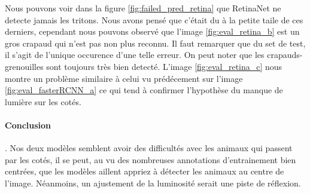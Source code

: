 Nous pouvons voir dans la figure \ref{fig:failed_pred_retina} que RetinaNet ne detecte jamais les tritons. Nous avons pensé que c'était du à la petite taile de ces derniers, cependant nous pouvons observé que l'image \ref{fig:eval_retina_b} est un gros crapaud qui n'est pas non plus reconnu. Il faut remarquer que du set de test, il s'agit de l'unique occurence d'une telle erreur.
On peut noter que les crapauds-grenouilles sont toujours très bien detecté. L'image \ref{fig:eval_retina_c} nous montre un problème similaire à celui vu prédécement sur l'image \ref{fig:eval_fasterRCNN_a} ce qui tend à confirmer l'hypothèse du manque de lumière sur les cotés.
\paragraph{Conclusion}. Nos deux modèles semblent avoir des difficultés avec les animaux qui passent par les cotés, il se peut, au vu des nombreuses annotations d'entrainement bien centrées, que les modèles aillent appriez à détecter les animaux au centre de l'image. Néanmoins, un ajustement de la luminosité serait une piste de réflexion.